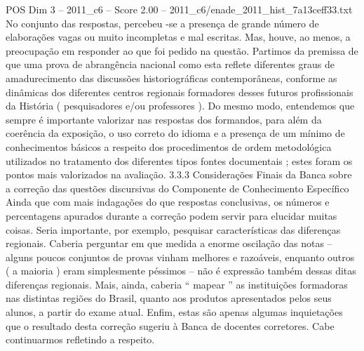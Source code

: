 \begin{textsample}{POS Dim 3 – 2011\_c6 – Score 2.00 – 2011\_c6/enade\_2011\_hist\_7a13ceff33.txt}
No conjunto das respostas, percebeu -se a presença de grande número de elaborações vagas ou muito incompletas e mal escritas.
Mas, houve, ao menos, a preocupação em responder ao que foi pedido na questão.
Partimos da premissa de que uma prova de abrangência nacional como esta reflete diferentes graus de amadurecimento das discussões historiográficas contemporâneas, conforme as dinâmicas dos diferentes centros regionais formadores desses futuros profissionais da História ( pesquisadores e/ou professores ).
Do mesmo modo, entendemos que sempre é importante valorizar nas respostas dos formandos, para além da coerência da exposição, o uso correto do idioma e a presença de um mínimo de conhecimentos básicos a respeito dos procedimentos de ordem metodológica utilizados no tratamento dos diferentes tipos fontes documentais ; estes foram os pontos mais valorizados na avaliação. 3.3.3 Considerações Finais da Banca sobre a correção das questões discursivas do Componente de Conhecimento Específico Ainda que com mais indagações do que respostas conclusivas, os números e percentagens apurados durante a correção podem servir para elucidar muitas coisas.
Seria importante, por exemplo, pesquisar características das diferenças regionais.
Caberia perguntar em que medida a enorme oscilação das notas – alguns poucos conjuntos de provas vinham melhores e razoáveis, enquanto outros ( a maioria ) eram simplesmente péssimos – não é expressão também dessas ditas diferenças regionais.
Mais, ainda, caberia “ mapear ” as instituições formadoras nas distintas regiões do Brasil, quanto aos produtos apresentados pelos seus alunos, a partir do exame atual.
Enfim, estas são apenas algumas inquietações que o resultado desta correção sugeriu à Banca de docentes corretores.
Cabe continuarmos refletindo a respeito.

\end{textsample}

